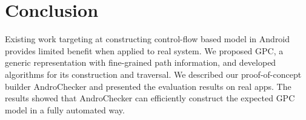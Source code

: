 %


\section{Conclusion}
Existing work targeting at constructing control-flow based model in Android provides limited benefit when applied to real system. We proposed GPC, a generic representation with fine-grained path information, and developed algorithms for its construction and traversal. We described our proof-of-concept builder AndroChecker and presented the evaluation results on real apps. The results showed that AndroChecker can efficiently construct the expected GPC model in a fully automated way. 

%
%

